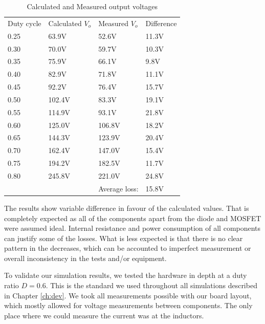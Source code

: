 \begin{table}[H]
\begin{center}
\caption {Calculated and Measured output voltages} \label{tab:V_OUT_ALL} 
\vspace{-1mm}
\begin{tabular}{|l|l|l|l|}
\cline{1-4}
Duty cycle & Calculated $V_o$ & Measured $V_o$& Difference \\ \cline{1-4}
0.25&	63.9V & 52.6V & 11.3V \\ \cline{1-4}
0.30&	70.0V & 59.7V & 10.3V \\ \cline{1-4}
0.35&	75.9V & 66.1V & 9.8V \\ \cline{1-4}
0.40&	82.9V & 71.8V & 11.1V \\ \cline{1-4}
0.45&	92.2V & 76.4V & 15.7V \\ \cline{1-4}
0.50&	102.4V & 83.3V & 19.1V \\ \cline{1-4}
0.55&	114.9V & 93.1V & 21.8V \\ \cline{1-4}
0.60&	125.0V & 106.8V & 18.2V\\ \cline{1-4}
0.65&	144.3V & 123.9V & 20.4V \\ \cline{1-4}
0.70&	162.4V & 147.0V & 15.4V\\ \cline{1-4}
0.75&	194.2V & 182.5V & 11.7V \\ \cline{1-4}
0.80&	245.8V & 221.0V & 24.8V\\ \cline{1-4}
&	 & Average loss:  & 15.8V \\ \cline{1-4}
\end{tabular}
\end{center}
\end{table}

The results show variable difference in favour of the calculated values. That is completely expected as all of the components apart from the diode and MOSFET were assumed ideal. Internal resistance and power consumption of all components can justify some of the losses. What is less expected is that there is no clear pattern in the decreases, which can be accounted to imperfect measurement or overall inconsistency in the tests and/or equipment. 

To validate our simulation results,
we tested the hardware in depth at a duty ratio $D = 0.6$.
This is the standard we used throughout all simulations described in Chapter \ref{ch:dev}.
We took all measurements possible with our board layout,
which mostly allowed for voltage measurements between components.
The only place where we could measure the current was at the inductors.

